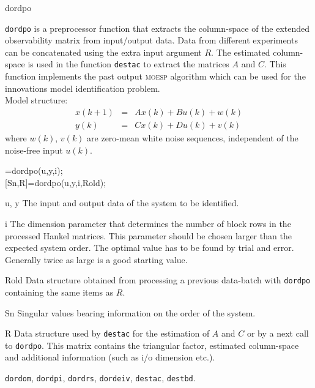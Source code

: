 \documentclass{book}
\newcommand{\moesp}{\textsc{moesp}}
\newcommand{\destbd}{\texttt{destbd}}
\newcommand{\dordom}{\texttt{dordom}}
\newcommand{\dordpo}{\texttt{dordpo}}
\newcommand{\dordpi}{\texttt{dordpi}}
\newcommand{\dordrs}{\texttt{dordrs}}
\newcommand{\dordeiv}{\texttt{dordeiv}}
\newcommand{\destac}{\texttt{destac}}
\begin{document}
\begin{command}{dordpo}
\begin{purpose}
  {\dordpo} is a preprocessor function that extracts the column-space of
  the extended observability matrix from input/output data. Data from
  different experiments can be concatenated using the extra input
  argument $R$. The estimated column-space is used in the function {\destac}
  to extract the matrices $A$ and $C$. This function implements the
  past output {\moesp} algorithm which can be used for the innovations model
  identification problem.\\
  Model structure:
  \begin{eqnarray*} 
    x(k+1) &=& Ax(k) + Bu(k) + w(k)\\
    y(k)   &=& Cx(k) + Du(k) + v(k)
  \end{eqnarray*}
  where $w(k)$, $v(k)$ are zero-mean white noise sequences,
  independent of the noise-free input $u(k)$.
\end{purpose}

\begin{syntax}
[Sn,R]=dordpo(u,y,i);\\[0pt]
[Sn,R]=dordpo(u,y,i,Rold);
\end{syntax}

\begin{inputs}
\item[u, y] The input and output data of the system to be
  identified.
\item[i] The dimension parameter that determines the number of block
  rows in the processed Hankel matrices. This parameter should be
  chosen larger than the expected system order. The optimal value has
  to be found by trial and error. Generally twice as large is a good
  starting value.
\item[Rold] Data structure obtained from processing a previous
  data-batch with {\dordpo} containing the same items as $R$.
\end{inputs}

\begin{outputs}
\item[Sn] Singular values bearing information on the order of the
  system.
\item[R] Data structure used by {\destac} for the estimation of $A$
  and $C$ or by a next call to {\dordpo}. This matrix contains the
  triangular factor, estimated column-space and additional information
  (such as i/o dimension etc.).
\end{outputs}
         
\begin{seealso}
\dordom, \dordpi, \dordrs, \dordeiv, \destac, \destbd.
\end{seealso}
\end{command}%
\end{document}
